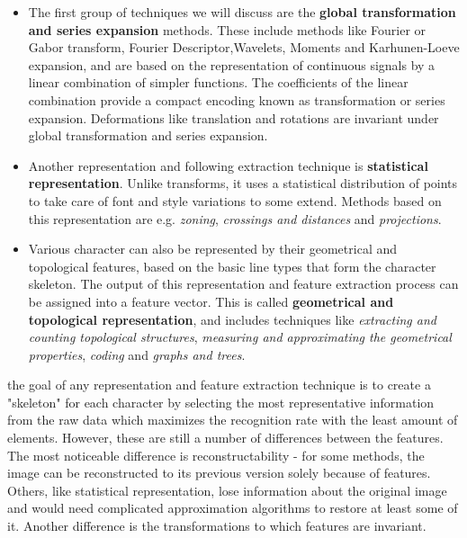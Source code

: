 \begin{itemize}

\item The first group of techniques we will discuss are the \textbf{global transformation and series expansion} 
 methods. These include methods like Fourier or Gabor transform, Fourier Descriptor,Wavelets, Moments and Karhunen-Loeve expansion, and are based on the representation of continuous signals by a linear combination of simpler functions. The coefficients of the linear combination provide a compact encoding known as transformation or series expansion. Deformations like translation and rotations are invariant under global transformation and series expansion.

\item Another  representation and following extraction technique is \textbf{statistical representation}. Unlike transforms, it uses a statistical distribution of points to take care of font and style variations to some extend. Methods based on this representation are e.g. \emph{zoning}, \emph{crossings and distances} and \emph{projections}.

\item Various character can also be represented by their geometrical and topological features, based on the basic line types that form the character skeleton. The output of this representation and feature extraction process can be assigned into a feature vector.
This is called \textbf{geometrical and topological representation}, and includes techniques like \emph{extracting and counting topological structures}, \emph{measuring and approximating the geometrical properties}, \emph{coding} and \emph{graphs and trees}.
\end{itemize}

 the goal of any representation and feature extraction technique is to create a "skeleton" for each character by selecting the most representative information from the raw data which maximizes the recognition rate with the least amount of elements. However, these are still a number of differences between the features. The most noticeable difference is reconstructability - for some methods, the image can be reconstructed to its previous version solely because of features. Others, like statistical representation, lose information about the original image and would need complicated approximation algorithms to restore at least some of it. Another difference is the transformations to which features are invariant.

